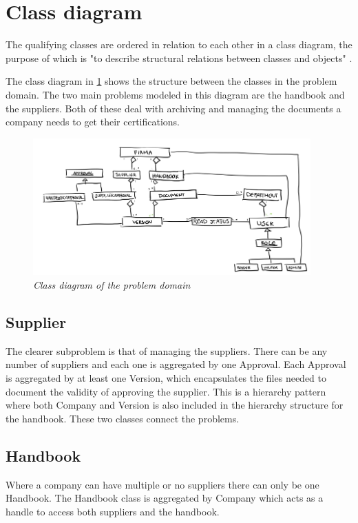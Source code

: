\section{Class diagram}
The qualifying classes are ordered in relation to each other in a class diagram, the purpose of which is "to describe structural relations between classes and objects" \citep[p.~71]{Rod-Aalborg}. 

The class diagram in \cref{fig:ClassDiagram} shows the structure between the classes in the problem domain.
The two main problems modeled in this diagram are the handbook and the suppliers.
Both of these deal with archiving and managing the documents a company needs to get their certifications.

\begin{figure}[H]
	\centering
	\includegraphics[width=0.95\textwidth]{billeder/classDiagram.png}
	\caption{\textit{Class diagram of the problem domain
	}}
	\label{fig:ClassDiagram}
\end{figure}

\subsection{Supplier}
The clearer subproblem is that of managing the suppliers. 
There can be any number of suppliers and each one is aggregated by one Approval. 
Each Approval is aggregated by at least one Version, which encapsulates the files needed to document the validity of approving the supplier.
This is a hierarchy pattern where both Company and Version is also included in the hierarchy structure for the handbook. 
These two classes connect the problems.

\subsection{Handbook}
Where a company can have multiple or no suppliers there can only be one Handbook. The Handbook class is aggregated by Company which acts as a handle to access both suppliers and the handbook.

